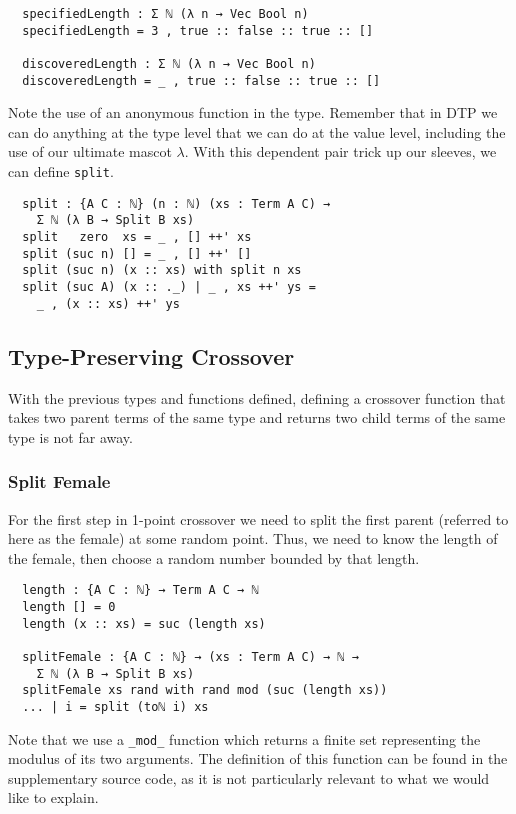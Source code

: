 \documentclass{acm_proc_article-sp}
\begin{document}
\begin{verbatim}
  specifiedLength : Σ ℕ (λ n → Vec Bool n)
  specifiedLength = 3 , true :: false :: true :: []

  discoveredLength : Σ ℕ (λ n → Vec Bool n)
  discoveredLength = _ , true :: false :: true :: []
\end{verbatim}

Note the use of an anonymous function in the type. Remember that in DTP
we can do anything at the type level that we can do at the value
level, including the use of our ultimate mascot $\lambda$. With this
dependent pair trick up our sleeves, we can define \texttt{split}.

\begin{verbatim}
  split : {A C : ℕ} (n : ℕ) (xs : Term A C) →
    Σ ℕ (λ B → Split B xs)
  split   zero  xs = _ , [] ++' xs
  split (suc n) [] = _ , [] ++' []
  split (suc n) (x :: xs) with split n xs
  split (suc A) (x :: ._) | _ , xs ++' ys =
    _ , (x :: xs) ++' ys
\end{verbatim}

\subsection{Type-Preserving Crossover}

With the previous types and functions defined, defining a
crossover function that takes two parent terms of the same type and
returns two child terms of the same type is not far away.

\subsubsection{Split Female}

For the first step in 1-point crossover we need to split the first
parent (referred to here as the female) at some random point. Thus, we
need to know the length of the female, then choose a random number
bounded by that length.

\begin{verbatim}
  length : {A C : ℕ} → Term A C → ℕ
  length [] = 0
  length (x :: xs) = suc (length xs)

  splitFemale : {A C : ℕ} → (xs : Term A C) → ℕ →
    Σ ℕ (λ B → Split B xs)
  splitFemale xs rand with rand mod (suc (length xs))
  ... | i = split (toℕ i) xs
\end{verbatim}

Note that we use a \texttt{\_mod\_} function which returns a finite set
representing the modulus of its two arguments. The definition of this
function can be found in the supplementary source code, as it is not
particularly relevant to what we would like to explain.
\end{document}
